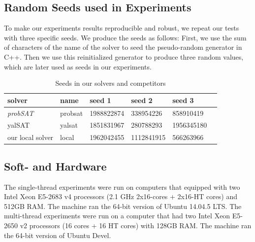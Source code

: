 \documentclass[12pt,a4paper,twoside]{scrartcl}
\numberwithin{equation}{section}
\begin{document}
\subsection{Random Seeds used in Experiments}
\label{sec:seed}
To make our experiments results reproducible and robust, we repeat our tests with three specific seeds. We produce the seeds as follows: First, we use the sum of characters of the name of the solver to seed the pseudo-random generator in C++.  Then we use this reinitialized generator to produce three random values, which are later used as seeds in our experiments. 
\begin{table}[h!]
\begin{center}
    \begin{tabular}{|l|l|l|l|l|p{1cm}|}
\hline 
    solver&name&seed 1&seed 2&seed 3 \\ \hline
	\emph{probSAT}&probsat&1988822874&338954226 &858910419 \\ \hline
	yalSAT &yalsat&1851831967&280788293&1956345180 \\ \hline
	our local solver & local&1962042455&1112841915&566263966 \\ \hline
	
\end{tabular}
\caption[probSAT]{Seeds in our solvers and competitors}
\end{center}
\end{table} 
\subsection{Soft- and Hardware}
The single-thread experiments were run on computers that equipped with two Intel Xeon E5-2683 v4 processors  (2.1 GHz 2x16-cores + 2x16-HT cores) and 512GB RAM. The machine ran the 64-bit version
of  Ubuntu 14.04.5 LTS. The multi-thread experiments were run on a computer that had two Intel Xeon E5-2650 v2 processors (16 cores + 16 HT cores) with 128GB RAM. The machine ran the 64-bit version of Ubuntu Devel. 
\clearpage
\end{document}
